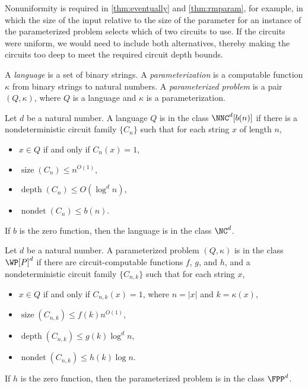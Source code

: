 \documentclass{article}
\DeclareMathOperator{\depth}{depth}
\DeclareMathOperator{\nondet}{nondet}
\DeclareMathOperator{\size}{size}
\begin{document}
Nonuniformity is required in \autoref{thm:eventually} and \autoref{thm:rmparam}, for example, in which the size of the input relative to the size of the parameter for an instance of the parameterized problem selects which of two circuits to use.
If the circuits were uniform, we would need to include both alternatives, thereby making the circuits too deep to meet the required circuit depth bounds.

\begin{definition}
  A \emph{language} is a set of binary strings.
  A \emph{parameterization} is a computable function $\kappa$ from binary strings to natural numbers.
  A \emph{parameterized problem} is a pair $(Q, \kappa)$, where $Q$ is a language and $\kappa$ is a parameterization.
\end{definition}

\begin{definition}
  Let $d$ be a natural number.
  A language $Q$ is in the class $\NNC^d[b(n)]$ if there is a nondeterministic circuit family $\{C_n\}$ such that for each string $x$ of length $n$,
  \begin{itemize}
  \item $x \in Q$ if and only if $C_n(x) = 1$,
  \item $\size(C_n) \leq n^{O(1)}$,
  \item $\depth(C_n) \leq O(\log^d n)$,
  \item $\nondet(C_n) \leq b(n)$.
  \end{itemize}
  If $b$ is the zero function, then the language is in the class $\NC^d$.
\end{definition}

\begin{definition}
  Let $d$ be a natural number.
  A parameterized problem $(Q, \kappa)$ is in the class $\WP[P]^d$ if there are circuit-computable functions $f$, $g$, and $h$, and a nondeterministic circuit family $\{C_{n, k}\}$ such that for each string $x$,
  \begin{itemize}
  \item $x \in Q$ if and only if $C_{n, k}(x) = 1$, where $n = |x|$ and $k = \kappa(x)$,
  \item $\size(C_{n, k}) \leq f(k) n^{O(1)}$,
  \item $\depth(C_{n, k}) \leq g(k) \log^d n$,
  \item $\nondet(C_{n, k}) \leq h(k) \log n$.
  \end{itemize}
  If $h$ is the zero function, then the parameterized problem is in the class $\FPP^d$.
\end{definition}
\end{document}
